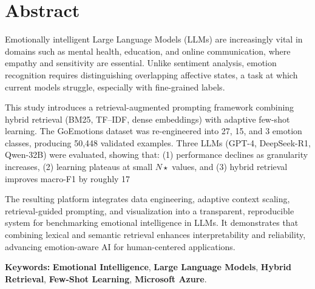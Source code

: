 \chapter*{Abstract}
\thispagestyle{plain}

\indent Emotionally intelligent Large Language Models (LLMs) are increasingly vital in domains such as mental health, education, and online communication, where empathy and sensitivity are essential. Unlike sentiment analysis, emotion recognition requires distinguishing overlapping affective states, a task at which current models struggle, especially with fine-grained labels.

\vspace{0.2cm}
\noindent This study introduces a retrieval-augmented prompting framework combining hybrid retrieval (BM25, TF–IDF, dense embeddings) with adaptive few-shot learning. The GoEmotions dataset was re-engineered into 27, 15, and 3 emotion classes, producing 50,448 validated examples. Three LLMs (GPT-4, DeepSeek-R1, Qwen-32B) were evaluated, showing that: (1) performance declines as granularity increases, (2) learning plateaus at small $N\star$ values, and (3) hybrid retrieval improves macro-F1 by roughly 17 %

\vspace{0.2cm}
\noindent The resulting platform integrates data engineering, adaptive context scaling, retrieval-guided prompting, and visualization into a transparent, reproducible system for benchmarking emotional intelligence in LLMs. It demonstrates that combining lexical and semantic retrieval enhances interpretability and reliability, advancing emotion-aware AI for human-centered applications.

\vspace{0.3cm}
\noindent \textbf{Keywords:} \textbf{Emotional Intelligence}, \textbf{Large Language Models}, \textbf{Hybrid Retrieval}, \textbf{Few-Shot Learning}, \textbf{Microsoft Azure}.

